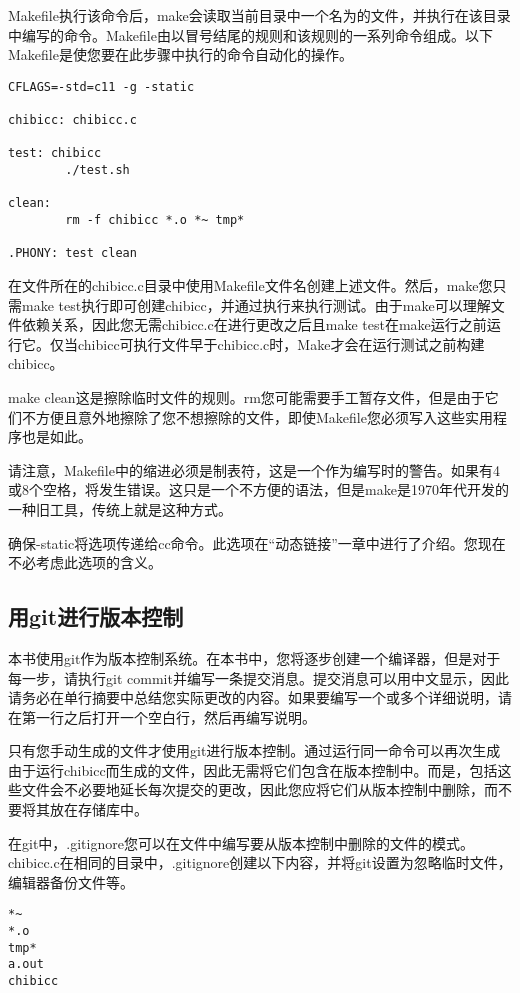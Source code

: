 \documentclass[cn,10pt,math=newtx,citestyle=gb7714-2015,bibstyle=gb7714-2015]{elegantbook}
\begin{document}
Makefile执行该命令后，make会读取当前目录中一个名为的文件，并执行在该目录中编写的命令。Makefile由以冒号结尾的规则和该规则的一系列命令组成。以下Makefile是使您要在此步骤中执行的命令自动化的操作。

\begin{verbatim}
CFLAGS=-std=c11 -g -static

chibicc: chibicc.c

test: chibicc
        ./test.sh

clean:
        rm -f chibicc *.o *~ tmp*

.PHONY: test clean
\end{verbatim}

在文件所在的chibicc.c目录中使用Makefile文件名创建上述文件。然后，make您只需make test执行即可创建chibicc，并通过执行来执行测试。由于make可以理解文件依赖关系，因此您无需chibicc.c在进行更改之后且make test在make运行之前运行它。仅当chibicc可执行文件早于chibicc.c时，Make才会在运行测试之前构建chibicc。

make clean这是擦除临时文件的规则。rm您可能需要手工暂存文件，但是由于它们不方便且意外地擦除了您不想擦除的文件，即使Makefile您必须写入这些实用程序也是如此。

请注意，Makefile中的缩进必须是制表符，这是一个作为编写时的警告。如果有4或8个空格，将发生错误。这只是一个不方便的语法，但是make是1970年代开发的一种旧工具，传统上就是这种方式。

确保-static将选项传递给cc命令。此选项在“动态链接”一章中进行了介绍。您现在不必考虑此选项的含义。

\subsection{用git进行版本控制}

本书使用git作为版本控制系统。在本书中，您将逐步创建一个编译器，但是对于每一步，请执行git commit并编写一条提交消息。提交消息可以用中文显示，因此请务必在单行摘要中总结您实际更改的内容。如果要编写一个或多个详细说明，请在第一行之后打开一个空白行，然后再编写说明。

只有您手动生成的文件才使用git进行版本控制。通过运行同一命令可以再次生成由于运行chibicc而生成的文件，因此无需将它们包含在版本控制中。而是，包括这些文件会不必要地延长每次提交的更改，因此您应将它们从版本控制中删除，而不要将其放在存储库中。

在git中，.gitignore您可以在文件中编写要从版本控制中删除的文件的模式。chibicc.c在相同的目录中，.gitignore创建以下内容，并将git设置为忽略临时文件，编辑器备份文件等。

\begin{verbatim}
*~
*.o
tmp*
a.out
chibicc
\end{verbatim}
\end{document}

